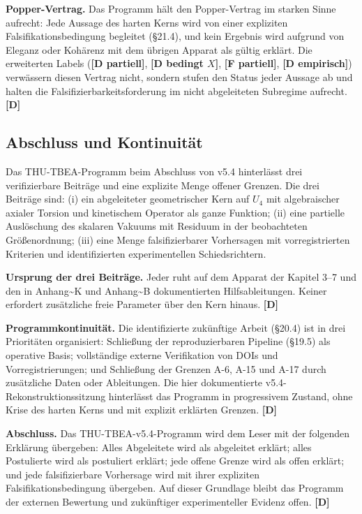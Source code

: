 ﻿\documentclass[11pt,letterpaper]{article}
\begin{document}
\textbf{Popper-Vertrag.} Das Programm hält den Popper-Vertrag im starken Sinne aufrecht: Jede Aussage des harten Kerns wird von einer expliziten Falsifikationsbedingung begleitet (§21.4), und kein Ergebnis wird aufgrund von Eleganz oder Kohärenz mit dem übrigen Apparat als gültig erklärt. Die erweiterten Labels (\textbf{[D partiell]}, \textbf{[D bedingt $X$]}, \textbf{[F partiell]}, \textbf{[D empirisch]}) verwässern diesen Vertrag nicht, sondern stufen den Status jeder Aussage ab und halten die Falsifizierbarkeitsforderung im nicht abgeleiteten Subregime aufrecht. \textbf{[D]}
\subsection{Abschluss und Kontinuität}
Das THU-TBEA-Programm beim Abschluss von v5.4 hinterlässt drei verifizierbare Beiträge und eine explizite Menge offener Grenzen. Die drei Beiträge sind: (i) ein abgeleiteter geometrischer Kern auf $U_4$ mit algebraischer axialer Torsion und kinetischem Operator als ganze Funktion; (ii) eine partielle Auslöschung des skalaren Vakuums mit Residuum in der beobachteten Größenordnung; (iii) eine Menge falsifizierbarer Vorhersagen mit vorregistrierten Kriterien und identifizierten experimentellen Schiedsrichtern.

\textbf{Ursprung der drei Beiträge.} Jeder ruht auf dem Apparat der Kapitel 3--7 und den in Anhang\textasciitilde{}K und Anhang\textasciitilde{}B dokumentierten Hilfsableitungen. Keiner erfordert zusätzliche freie Parameter über den Kern hinaus. \textbf{[D]}

\textbf{Programmkontinuität.} Die identifizierte zukünftige Arbeit (§20.4) ist in drei Prioritäten organisiert: Schließung der reproduzierbaren Pipeline (§19.5) als operative Basis; vollständige externe Verifikation von DOIs und Vorregistrierungen; und Schließung der Grenzen A-6, A-15 und A-17 durch zusätzliche Daten oder Ableitungen. Die hier dokumentierte v5.4-Rekonstruktionssitzung hinterlässt das Programm in progressivem Zustand, ohne Krise des harten Kerns und mit explizit erklärten Grenzen. \textbf{[D]}

\textbf{Abschluss.} Das THU-TBEA-v5.4-Programm wird dem Leser mit der folgenden Erklärung übergeben: Alles Abgeleitete wird als abgeleitet erklärt; alles Postulierte wird als postuliert erklärt; jede offene Grenze wird als offen erklärt; und jede falsifizierbare Vorhersage wird mit ihrer expliziten Falsifikationsbedingung übergeben. Auf dieser Grundlage bleibt das Programm der externen Bewertung und zukünftiger experimenteller Evidenz offen. \textbf{[D]}
\end{document}
